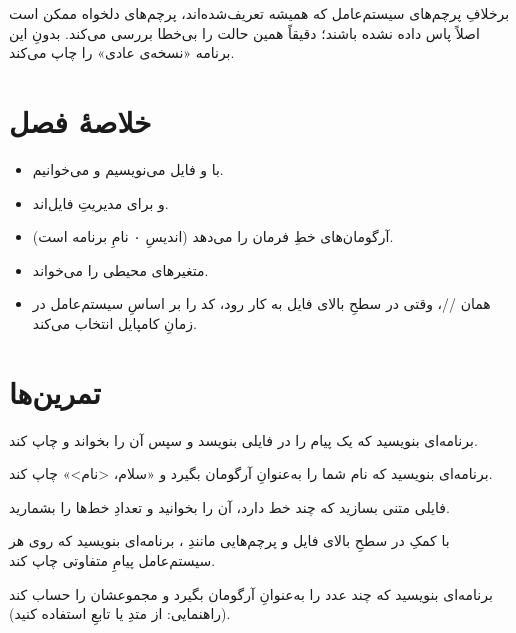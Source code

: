 برخلافِ پرچم‌های سیستم‌عامل که همیشه تعریف‌شده‌اند، پرچم‌های دلخواه ممکن است
اصلاً پاس داده نشده باشند؛  دقیقاً همین حالت را بی‌خطا
بررسی می‌کند. بدونِ  این برنامه «نسخه‌ی عادی» را چاپ می‌کند.

\section{خلاصهٔ فصل}

\begin{itemize}
  \item با  و  فایل می‌نویسیم و می‌خوانیم.
  \item {} و  برای مدیریتِ فایل‌اند.
  \item {} آرگومان‌های خطِ فرمان را می‌دهد (اندیسِ ۰ نامِ
        برنامه است).
  \item {} متغیرهای محیطی را می‌خواند.
  \item همان //، وقتی در سطحِ بالای فایل
        به کار رود، کد را بر اساسِ سیستم‌عامل در زمانِ کامپایل انتخاب می‌کند.
\end{itemize}

\section{تمرین‌ها}

\exercise برنامه‌ای بنویسید که یک پیام را در فایلی بنویسد و سپس آن را بخواند و
چاپ کند.

\exercise برنامه‌ای بنویسید که نام شما را به‌عنوانِ آرگومان بگیرد و «سلام،
<نام>» چاپ کند.

\exercise فایلی متنی بسازید که چند خط دارد، آن را بخوانید و تعدادِ خط‌ها را
بشمارید.

\exercise با کمکِ  در سطحِ بالای فایل و پرچم‌هایی مانندِ
، برنامه‌ای بنویسید که روی هر سیستم‌عامل پیامِ
متفاوتی چاپ کند.

\exercise برنامه‌ای بنویسید که چند عدد را به‌عنوانِ آرگومان بگیرد و مجموعشان را
حساب کند (راهنمایی: از متدِ  یا تابعِ  استفاده کنید).
